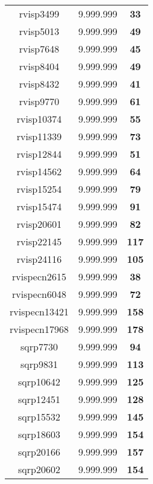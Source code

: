 \begin{tabular}{cc||c}
rvisp3499        & 9.999.999        & {\bf 33}        \\ 
rvisp5013        & 9.999.999        & {\bf 49}        \\ 
rvisp7648        & 9.999.999        & {\bf 45}        \\ 
rvisp8404        & 9.999.999        & {\bf 49}        \\ 
rvisp8432        & 9.999.999        & {\bf 41}        \\ 
rvisp9770        & 9.999.999        & {\bf 61}        \\ 
rvisp10374       & 9.999.999        & {\bf 55}        \\ 
rvisp11339       & 9.999.999        & {\bf 73}        \\ 
rvisp12844       & 9.999.999        & {\bf 51}        \\ 
rvisp14562       & 9.999.999        & {\bf 64}        \\ 
rvisp15254       & 9.999.999        & {\bf 79}        \\ 
rvisp15474       & 9.999.999        & {\bf 91}        \\ 
rvisp20601       & 9.999.999        & {\bf 82}        \\ 
rvisp22145       & 9.999.999        & {\bf 117}       \\ 
rvisp24116       & 9.999.999        & {\bf 105}       \\ 
rvispecn2615     & 9.999.999        & {\bf 38}        \\ 
rvispecn6048     & 9.999.999        & {\bf 72}        \\ 
rvispecn13421    & 9.999.999        & {\bf 158}       \\ 
rvispecn17968    & 9.999.999        & {\bf 178}       \\ 
sqrp7730         & 9.999.999        & {\bf 94}        \\ 
sqrp9831         & 9.999.999        & {\bf 113}       \\ 
sqrp10642        & 9.999.999        & {\bf 125}       \\ 
sqrp12451        & 9.999.999        & {\bf 128}       \\ 
sqrp15532        & 9.999.999        & {\bf 145}       \\ 
sqrp18603        & 9.999.999        & {\bf 154}       \\ 
sqrp20166        & 9.999.999        & {\bf 157}       \\ 
sqrp20602        & 9.999.999        & {\bf 154}       \\ 

\end{tabular}
